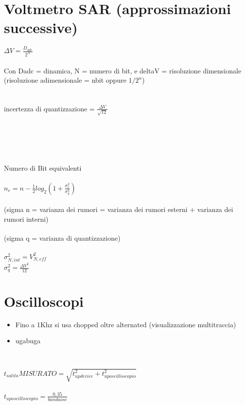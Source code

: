 \documentclass{article}
\begin{document}
 		\section{Voltmetro SAR (approssimazioni successive)}
 		
 		\(\Delta V = \frac{D_{adc}}{2^N}\)\\\\
 		Con Dadc = dinamica, N = numero di bit, e deltaV = risoluzione dimensionale (risoluzione adimensionale = nbit oppure \(1/2^n\))\\\\\\
 		
 		incertezza di quantizzazione = \(\frac{\Delta V}{\sqrt{12}}\)\\\\\\\\\\\\
 		 		
 		Numero di Bit equivalenti\\\\
 		
 		\(n_e = n-\frac{1}{2}log_2(1+\frac{\sigma^2_c}{\sigma^2_q})\)\\\\
 		(sigma n = varianza dei rumori = varianza dei rumori esterni + varianza dei rumori interni)\\\\
 		(sigma q = varianza di quantizzazione)\\\\
 		\(\sigma_{N,int}^2 = V_{N,eff}^2\)\\
 		\(\sigma_{q}^2 = \frac{\Delta V^2}{12}\)\\
 		
 		
 		
 		
 		\section{Oscilloscopi}
 		
 		\begin{itemize}
 			\item Fino a 1Khz si usa chopped oltre alternated (visualizzazione multitraccia)
 			\item ugabuga
 		\end{itemize}
 		\
 	
 	 	\(t_{salita} MISURATO = \sqrt{t^2_{updevice}+t^2_{uposcilloscopio}}\)\\\\
 		\(t_{uposcilloscopio} = \frac{0,35}{bandaosc}\)\\\\
 		
		
\end{document}
